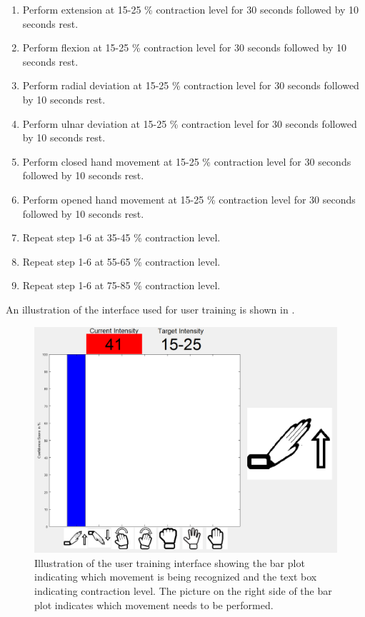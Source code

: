 \begin{enumerate}
	\item Perform extension at 15-25 \% contraction level for 30 seconds followed by 10 seconds rest.
	\item Perform flexion at 15-25 \% contraction level for 30 seconds followed by 10 seconds rest.
	\item Perform radial deviation at 15-25 \% contraction level for 30 seconds followed by 10 seconds rest.
	\item Perform ulnar deviation at 15-25 \% contraction level for 30 seconds followed by 10 seconds rest.
	\item Perform closed hand movement at 15-25 \% contraction level for 30 seconds followed by 10 seconds rest.
	\item Perform opened hand movement at 15-25 \% contraction level for 30 seconds followed by 10 seconds rest.
	\item Repeat step 1-6 at 35-45 \% contraction level.
	\item Repeat step 1-6 at 55-65 \% contraction level.
	\item Repeat step 1-6 at 75-85 \% contraction level.
\end{enumerate} 

An illustration of the interface used for user training is shown in .

\begin{figure}[H]                 
	\includegraphics[width=.6\textwidth]{figures/xBackground/usertraincontrolGUI}  
	\caption{Illustration of the user training interface showing the bar plot indicating which movement is being recognized and the text box indicating contraction level. The picture on the right side of the bar plot indicates which movement needs to be performed.}
	\label{fig:usertraincontrolGUI} 
\end{figure}

